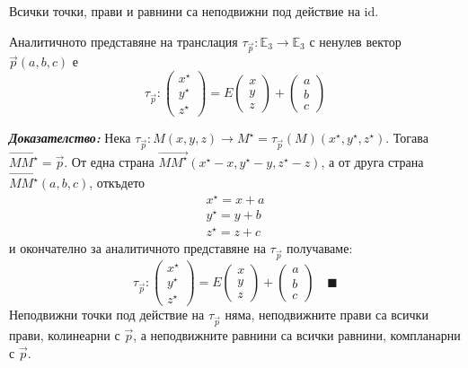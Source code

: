 \documentclass[12pt]{article}
\begin{document}
Всички точки, прави и равнини са неподвижни под действие на $\mathrm{id}$.
\begin{tcolorbox}[
    colback=blue!5,    %
    colframe=blue!75!black, %
    title={\textbf{Твърдение 23:}}, %
    fonttitle=\bfseries,
    boxrule=0.8pt,
    arc=1mm,           %
    top=2mm, bottom=2mm, left=3mm, right=3mm
] Аналитичното представяне на транслация $\tau_{\vec{p}}:\mathbb{E}_3\to\mathbb{E}_3$ с ненулев вектор $\vec{p}(a,b,c)$ е $$\tau_{\vec{p}}:\begin{pmatrix} x^\star \\ y^\star\\ z^\star\end{pmatrix}=E\begin{pmatrix} x\\ y\\ z\end{pmatrix}+\begin{pmatrix} a \\ b\\ c\end{pmatrix}$$
\end{tcolorbox}
\textbf{\textit{Доказателство:}} Нека $\tau_{\vec{p}}:M(x,y,z)\to M^\star=\tau_{\vec{p}}(M)(x^\star,y^\star,z^\star)$. Тогава $\overrightarrow{MM^\star}=\vec{p}$. От една страна $\overrightarrow{MM^\star}(x^\star-x,y^\star-y,z^\star-z)$, а от друга страна $\overrightarrow{MM^\star}(a,b,c)$, откъдето $$\begin{array}{|l} x^\star=x+a \\ y^\star=y+b \\ z^\star = z + c\end{array}$$ и окончателно за аналитичното представяне на $\tau_{\vec{p}}$ получаваме: $$\tau_{\vec{p}}:\begin{pmatrix} x^\star \\ y^\star\\ z^\star\end{pmatrix}=E\begin{pmatrix} x\\ y\\ z\end{pmatrix}+\begin{pmatrix} a \\ b\\ c\end{pmatrix}\quad \blacksquare$$
Неподвижни точки под действие на $\tau_{\vec{p}}$ няма, неподвижните прави са всички прави, колинеарни с $\vec{p}$, а неподвижните равнини са всички равнини, компланарни с $\vec{p}$.
\end{document}
